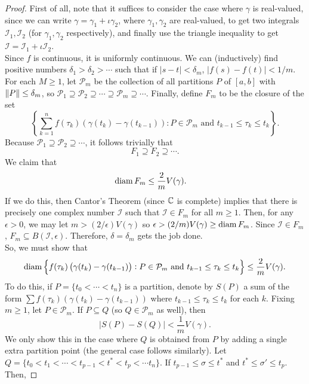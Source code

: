 		\begin{proof}
			First of all, note that it suffices to consider the case where $\gamma$ is real-valued, since we can write $\gamma = \gamma_1 + \iota \gamma_2$, where $\gamma_1,\gamma_2$ are real-valued, to get two integrals $\mathcal{I}_1,\mathcal{I}_2$ (for $\gamma_1,\gamma_2$ respectively), and finally use the triangle inequality to get $\mathcal{I} = \mathcal{I}_1 + \iota\mathcal{I}_2$.\\
			Since $f$ is continuous, it is uniformly continuous. We can (inductively) find positive numbers $\delta_1 > \delta_2 > \cdots $ such that if $|s-t| < \delta_m$, $|f(s) - f(t)| < 1/m$. For each $M \ge 1$, let $\mathcal{P}_m$ be the collection of all partitions $P$ of $[a,b]$ with $\left\lVert P\right\rVert \le \delta_m$, so $\mathcal{P}_1 \supseteq \mathcal{P}_2 \supseteq \cdots \supseteq \mathcal{P}_m \supseteq \cdots$. Finally, define $F_m$ to be the closure of the set
			\[ \left\{ \sum_{k=1}^n f(\tau_k) (\gamma(t_k) - \gamma(t_{k-1})) : P \in \mathcal{P}_m \text{ and } t_{k-1} \le \tau_k \le t_k \right\}. \]
			Because $\mathcal{P}_1 \supseteq \mathcal{P}_2 \supseteq \cdots$, it follows trivially that
			\[ F_1 \supseteq F_2 \supseteq \cdots. \]
			We claim that
			\begin{align}
				\operatorname{diam} F_m &\le \frac{2}{m} V(\gamma). \label{eqn: diam-bound}
			\end{align}
			If we do this, then Cantor's Theorem (since $\mathbb{C}$ is complete) implies that there is precisely one complex number $\mathcal{I}$ such that $\mathcal{I} \in F_m$ for all $m \ge 1$. Then, for any $\epsilon > 0$, we may let $m > (2/\epsilon)V(\gamma)$ so $\epsilon > (2/m) V(\gamma) \ge \operatorname{diam} F_m$. Since $\mathcal{I} \in F_m$, $F_m \subseteq B(\mathcal{I},\epsilon)$. Therefore, $\delta = \delta_m$ gets the job done.\\
			So, we must show that
			\[ \operatorname{diam} \left\{ f(\tau_k) \left( \gamma(t_k) - \gamma(t_{k-1}) \right) : P \in \mathcal{P}_m \text{ and } t_{k-1} \le \tau_k \le t_k \right\} \le \frac{2}{m} V(\gamma). \]
			To do this, if $P = \{ t_0 < \cdots < t_n \}$ is a partition, denote by $S(P)$ a sum of the form $\sum f(\tau_k) \left( \gamma(t_k)  - \gamma(t_{k-1})\right)$ where $t_{k-1} \le \tau_k \le t_k$ for each $k$. Fixing $m \ge 1$, let $P \in \mathcal{P}_m$. If $P \subseteq Q$ (so $Q \in \mathcal{P}_m$ as well), then
			\[ |S(P) - S(Q)| < \frac{1}{m} V(\gamma). \]
			We only show this in the case where $Q$ is obtained from $P$ by adding a single extra partition point (the general case follows similarly). Let $Q = \{ t_0 < t_1 < \cdots < t_{p-1} < t^* < t_p < \cdots t_n \}$. If $t_{p-1} \le \sigma \le t^*$ and $t^* \le \sigma' \le t_p$. Then,

\end{proof}
